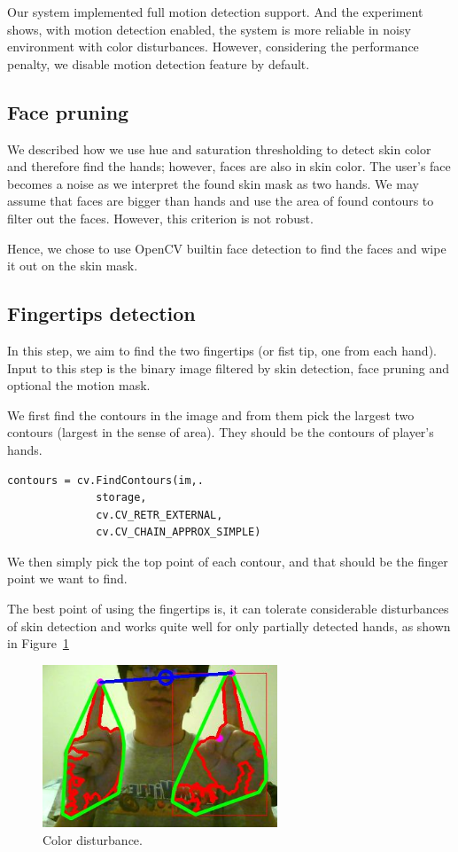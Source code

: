 \documentclass[10pt,twocolumn,letterpaper]{article}
\begin{document}
Our system implemented full motion detection support. 
And the experiment shows, with motion detection enabled, 
the system is more reliable in noisy environment with color 
disturbances. However, considering the performance penalty, we 
disable motion detection feature by default.

\subsection{Face pruning}
\label{sec:face}
We described how we use hue and saturation thresholding to detect skin
 color and therefore find the hands; however, faces are also in skin color. 
 The user's face becomes a noise as we interpret the found skin mask as 
 two hands. We may assume that faces are bigger than hands and use 
 the area of found contours to filter out the faces. However, this criterion is not robust. 

 Hence, we chose to use OpenCV builtin face detection to find the faces 
 and wipe it out on the skin mask.


\subsection{Fingertips detection}
In this step, we aim to find the two fingertips (or fist tip, 
one from each hand). Input to this step is the binary image 
filtered by skin detection, face pruning and optional the motion mask.

We first find the contours in the image and from them pick the 
largest two contours (largest in the sense of area). They should 
be the contours of player’s hands. 

\begin{verbatim}
contours = cv.FindContours(im,.
              storage,
              cv.CV_RETR_EXTERNAL,
              cv.CV_CHAIN_APPROX_SIMPLE)
\end{verbatim}

We then simply pick the top point of each contour, and that 
should be the finger point we want to find.

The best point of using the fingertips is, it can tolerate 
considerable disturbances of skin detection and works quite 
well for only partially detected hands, as shown in Figure~\ref{fig:fingertip}

\begin{figure}[h]
\centering
\includegraphics[width=7cm]{fingertip.png}
\caption{Color disturbance.}
\label{fig:fingertip}
\end{figure}
\end{document}
